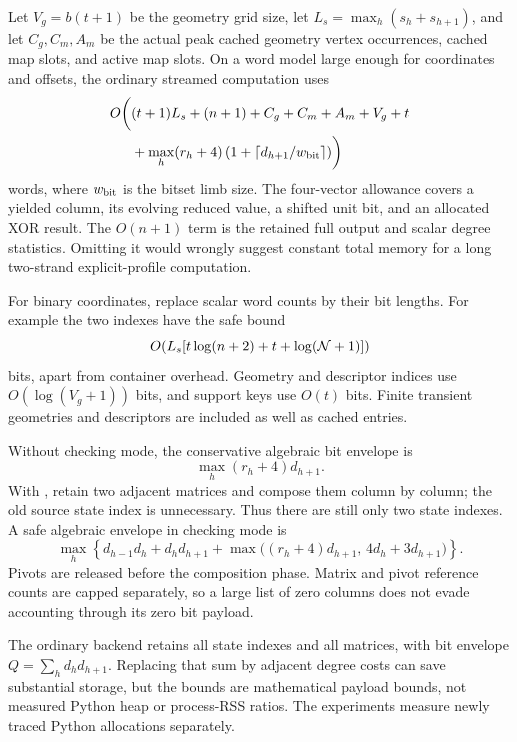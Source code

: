 Let \(V_g=b(t+1)\) be the geometry grid size, let
\(L_s=\max_h(s_h+s_{h+1})\), and let \(C_g,C_m,A_m\) be the actual
peak cached geometry vertex occurrences, cached map slots, and active
map slots. On a word model large enough for coordinates and offsets,
the ordinary streamed computation uses
\begin{equation}\label{eq:stream-space}
\begin{split}
O\biggl(& (t+1)L_s+(n+1)+C_g+C_m+A_m+V_g+t\\
&+\max_h(r_h+4)
\left(1+\left\lceil d_{h+1}/w_{\rm bit}\right\rceil\right)\biggr)
\end{split}
\end{equation}
words, where \(w_{\rm bit}\) is the bitset limb size.
The four-vector allowance covers a yielded column, its evolving reduced
value, a shifted unit bit, and an allocated XOR result.
The \(O(n+1)\) term is the retained full output and scalar degree
statistics. Omitting it would wrongly suggest constant total memory for
a long two-strand explicit-profile computation.

For binary coordinates, replace scalar word counts by their bit lengths.
For example the two indexes have the safe bound
\[
O\!\left(L_s[t\log(n+2)+t+\log(\mathcal N+1)]\right)
\]
bits, apart from container overhead. Geometry and descriptor indices use
\(O(\log(V_g+1))\) bits, and support keys use \(O(t)\) bits.
Finite transient geometries and descriptors are included as well as
cached entries.

Without checking mode, the conservative algebraic bit envelope is
\[
\max_h(r_h+4)d_{h+1}.
\]
With , retain two adjacent matrices and compose them
column by column; the old source state index is unnecessary.
Thus there are still only two state indexes. A safe algebraic envelope
in checking mode is
\begin{equation}\label{eq:d2space}
\max_h\left\{
d_{h-1}d_h+d_hd_{h+1}
+\max\bigl((r_h+4)d_{h+1},\,4d_h+3d_{h+1}\bigr)
\right\}.
\end{equation}
Pivots are released before the composition phase. Matrix and pivot
reference counts are capped separately, so a large list of zero columns
does not evade accounting through its zero bit payload.

The ordinary backend retains all state indexes and all matrices, with
bit envelope \(Q=\sum_hd_hd_{h+1}\). Replacing that sum by adjacent
degree costs can save substantial storage, but the bounds are
mathematical payload bounds, not measured Python heap or process-RSS
ratios. The experiments measure newly traced Python allocations
separately.

